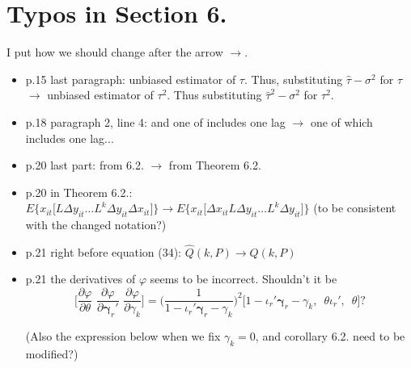 \section*{Typos in Section 6.}

I put how we should change after the arrow $\rightarrow$. 

\begin{itemize}
\item p.15 last paragraph: unbiased estimator of $\tau$. Thus, substituting $\widehat{\tau}-\sigma^2$ for $\tau$ $\rightarrow$ unbiased estimator of $\tau^2$. Thus substituting $\widehat{\tau}^2-\sigma^2$ for $\tau^2$. 
\item p.18 paragraph 2, line 4: and one of includes one lag $\rightarrow$ one of which includes one lag...
\item p.20 last part: from 6.2. $\rightarrow$ from Theorem 6.2.
\item p.20 in Theorem 6.2.: $E\big\{ x_{it} \big[ L\Delta y_{it} \ldots L^k \Delta y_{it} \Delta x_{it} \big] \big \} \rightarrow E\big\{ x_{it} \big[ \Delta x_{it} L\Delta y_{it} \ldots L^k \Delta y_{it}  \big] \big \}$ (to be consistent with the changed notation?)
\item p.21 right before equation (34): $\widehat{Q}(k, P) \rightarrow Q(k,P)$
\item p.21 the derivatives of $\varphi$ seems to be incorrect. Shouldn't it be
\[
\bigg[\frac{\partial \varphi}{\partial \theta}\,\, \frac{\partial \varphi}{\partial \mathbf{\gamma}_r'}\,\, \frac{\partial \varphi}{\partial \gamma_k} \bigg] = \bigg(\frac{1}{1-\iota_r'\mathbf{\gamma}_r - \gamma_k }  \bigg)^2 \big [1-\iota_r'\mathbf{\gamma}_r - \gamma_k, \, \,\, \theta \iota_r',  \,\,\, \theta \big]?
\]

(Also the expression below when we fix $\gamma_k = 0$, and corollary 6.2. need to be modified?)
\end{itemize}


